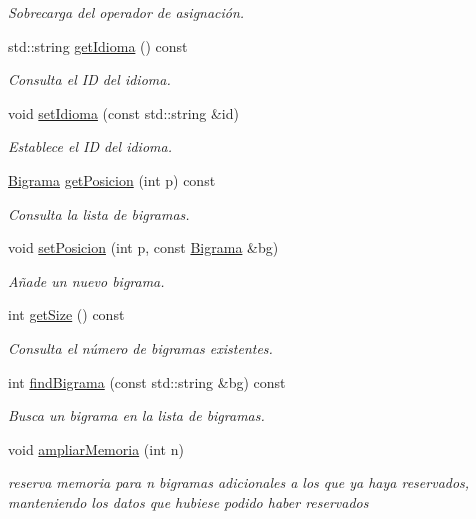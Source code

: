 \begin{DoxyCompactItemize}
\begin{DoxyCompactList}\small\item\em Sobrecarga del operador de asignación. \end{DoxyCompactList}\item 
std\+::string \hyperlink{classIdioma_a7e00ccf37184dbe4247df7c093b4456d}{get\+Idioma} () const
\begin{DoxyCompactList}\small\item\em Consulta el ID del idioma. \end{DoxyCompactList}\item 
void \hyperlink{classIdioma_ade18af885e0762821718876f7de496df}{set\+Idioma} (const std\+::string \&id)
\begin{DoxyCompactList}\small\item\em Establece el ID del idioma. \end{DoxyCompactList}\item 
\hyperlink{classBigrama}{Bigrama} \hyperlink{classIdioma_ae20fa510506967e26191fcb930fc210e}{get\+Posicion} (int p) const
\begin{DoxyCompactList}\small\item\em Consulta la lista de bigramas. \end{DoxyCompactList}\item 
void \hyperlink{classIdioma_ae645826d470547ecd8decc4a9498fb55}{set\+Posicion} (int p, const \hyperlink{classBigrama}{Bigrama} \&bg)
\begin{DoxyCompactList}\small\item\em Añade un nuevo bigrama. \end{DoxyCompactList}\item 
int \hyperlink{classIdioma_a32dc7a4370ad2b5dff89ce331acac878}{get\+Size} () const
\begin{DoxyCompactList}\small\item\em Consulta el número de bigramas existentes. \end{DoxyCompactList}\item 
int \hyperlink{classIdioma_a111e1cdd3070e81782b6890e14391804}{find\+Bigrama} (const std\+::string \&bg) const
\begin{DoxyCompactList}\small\item\em Busca un bigrama en la lista de bigramas. \end{DoxyCompactList}\item 
void \hyperlink{classIdioma_a106ba8d7b9956a97243abc33a3ccea0b}{ampliar\+Memoria} (int n)
\begin{DoxyCompactList}\small\item\em reserva memoria para {\itshape n} bigramas adicionales a los que ya haya reservados, manteniendo los datos que hubiese podido haber reservados \end{DoxyCompactList}\item 

\end{DoxyCompactItemize}

